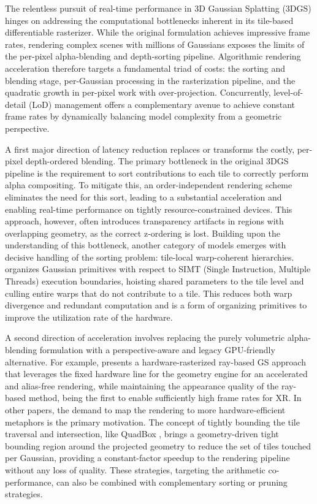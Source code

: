 \documentclass[11pt,a4paper]{article}
\begin{document}
The relentless pursuit of real-time performance in 3D Gaussian Splatting (3DGS) hinges on addressing the computational bottlenecks inherent in its tile-based differentiable rasterizer. While the original formulation \cite{arxiv:2308.04079v1} achieves impressive frame rates, rendering complex scenes with millions of Gaussians exposes the limits of the per-pixel alpha-blending and depth-sorting pipeline. Algorithmic rendering acceleration therefore targets a fundamental triad of costs: the sorting and blending stage, per-Gaussian processing in the rasterization pipeline, and the quadratic growth in per-pixel work with over-projection. Concurrently, level-of-detail (LoD) management offers a complementary avenue to achieve constant frame rates by dynamically balancing model complexity from a geometric perspective.

A first major direction of latency reduction replaces or transforms the costly, per-pixel depth-ordered blending. The primary bottleneck in the original 3DGS pipeline is the requirement to sort contributions to each tile to correctly perform alpha compositing. To mitigate this, an order-independent rendering scheme \cite{arxiv:2603.11531v1} eliminates the need for this sort, leading to a substantial acceleration and enabling real-time performance on tightly resource-constrained devices. This approach, however, often introduces transparency artifacts in regions with overlapping geometry, as the correct z-ordering is lost. Building upon the understanding of this bottleneck, another category of models emerges with decisive handling of the sorting problem: tile-local warp-coherent hierarchies. \cite{arxiv:2606.16566v1} organizes Gaussian primitives with respect to SIMT (Single Instruction, Multiple Threads) execution boundaries, hoisting shared parameters to the tile level and culling entire warps that do not contribute to a tile. This reduces both warp divergence and redundant computation and is a form of organizing primitives to improve the utilization rate of the hardware.

A second direction of acceleration involves replacing the purely volumetric alpha-blending formulation with a perspective-aware and legacy GPU-friendly alternative. For example, \cite{arxiv:2503.18682v2} presents a hardware-rasterized ray-based GS approach that leverages the fixed hardware line for the geometry engine for an accelerated and alias-free rendering, while maintaining the appearance quality of the ray-based method, being the first to enable sufficiently high frame rates for XR. In other papers, the demand to map the rendering to more hardware-efficient metaphors is the primary motivation. The concept of tightly bounding the tile traversal and intersection, like QuadBox \cite{arxiv:2605.04844v1}, brings a geometry-driven tight bounding region around the projected geometry to reduce the set of tiles touched per Gaussian, providing a constant-factor speedup to the rendering pipeline without any loss of quality. These strategies, targeting the arithmetic co-performance, can also be combined with complementary sorting or pruning strategies.
\end{document}
